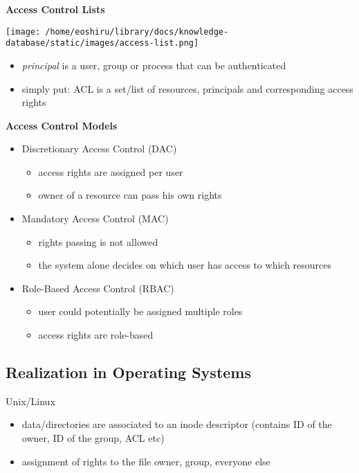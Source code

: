 \documentclass[11pt]{article}
\begin{document}
\textbf{Access Control Lists}\\
\begin{center}
\texttt{[image: /home/eoshiru/library/docs/knowledge-database/static/images/access-list.png]}
\end{center}
\begin{itemize}
\item \emph{principal} is a user, group or process that can be authenticated
\item simply put: ACL is a set/list of resources, principals and corresponding access rights
\end{itemize}

\textbf{Access Control Models}\\
\begin{itemize}
\item Discretionary Access Control (DAC)
\begin{itemize}
\item access rights are assigned per user
\item owner of a resource can pass his own rights
\end{itemize}
\item Mandatory Access Control (MAC)
\begin{itemize}
\item rights passing is not allowed
\item the system alone decides on which user has access to which resources
\end{itemize}
\item Role-Based Access Control (RBAC)
\begin{itemize}
\item user could potentially be assigned multiple roles
\item access rights are role-based
\end{itemize}
\end{itemize}

\subsection{Realization in Operating Systems}
\label{sec:org64cfdd6}

Unix/Linux
\begin{itemize}
\item data/directories are associated to an inode descriptor (contains ID of the owner, ID of the group, ACL etc)
\item assignment of rights to the file owner, group, everyone else
\end{itemize}
\end{document}
